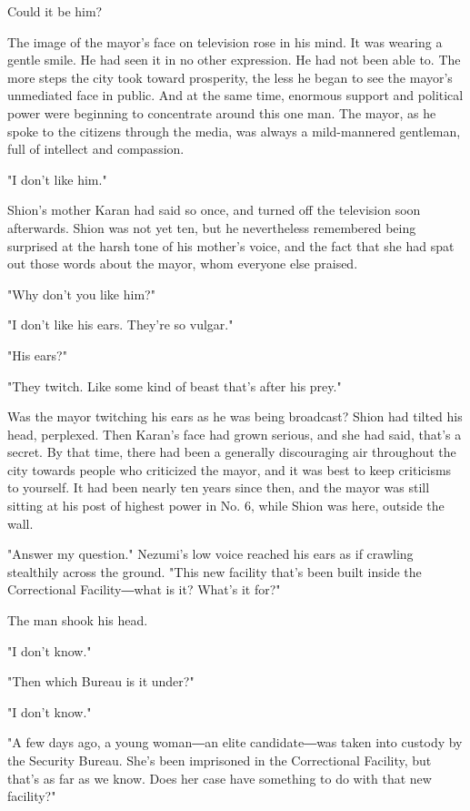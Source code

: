 Could it be him?

The image of the mayor's face on television rose in his mind. It was
wearing a gentle smile. He had seen it in no other expression. He had
not been able to. The more steps the city took toward prosperity, the
less he began to see the mayor's unmediated face in public. And at the
same time, enormous support and political power were beginning to
concentrate around this one man. The mayor, as he spoke to the citizens
through the media, was always a mild-mannered gentleman, full of
intellect and compassion.

"I don't like him."

Shion's mother Karan had said so once, and turned off the television
soon afterwards. Shion was not yet ten, but he nevertheless remembered
being surprised at the harsh tone of his mother's voice, and the fact
that she had spat out those words about the mayor, whom everyone else
praised.

"Why don't you like him?"

"I don't like his ears. They're so vulgar."

"His ears?"

"They twitch. Like some kind of beast that's after his prey."

Was the mayor twitching his ears as he was being broadcast? Shion had
tilted his head, perplexed. Then Karan's face had grown serious, and she
had said, that's a secret. By that time, there had been a generally
discouraging air throughout the city towards people who criticized the
mayor, and it was best to keep criticisms to yourself. It had been
nearly ten years since then, and the mayor was still sitting at his post
of highest power in No. 6, while Shion was here, outside the wall.

"Answer my question." Nezumi's low voice reached his ears as if crawling
stealthily across the ground. "This new facility that's been built
inside the Correctional Facility―what is it? What's it for?"

The man shook his head.

"I don't know."

"Then which Bureau is it under?"

"I don't know."

"A few days ago, a young woman―an elite candidate―was taken into custody
by the Security Bureau. She's been imprisoned in the Correctional
Facility, but that's as far as we know. Does her case have something to
do with that new facility?"

